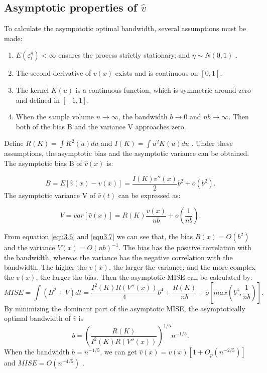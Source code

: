 \subsection{ Asymptotic properties of $\hat{v}$}
To calculate the asympototic optimal bandwidth, several assumptions must be made:
 \begin{enumerate}
  \item $E(\varepsilon_{t}^{8})<\infty$ ensures the process strictly stationary, and $\eta \sim N(0,1)$ \citep{Ling2002}.
  \item The second derivative of $v(x)$ exists and is continuous on $[0,1]$.
  \item The kernel $K(u)$ is a continuous function, which is symmetric around zero and defined in $[-1, 1]$.
  
  \item When the sample volume $n \rightarrow \infty $, the bandwidth $b \rightarrow 0 $ and $nb \rightarrow \infty $. Then both of the bias B and the variance V approaches zero.
 
\end{enumerate}
Define $R(K)= \int K^{2}(u)du$ and $I(K)=\int u^{2}K(u)du$ . Under these assumptions, the asymptotic bias and the asymptotic variance can be obtained.
The asymptotic bias B of $\hat{v}(x)$ is:

\begin{equation}
\label{equ3.6}
B=E[\hat{v}(x)-v(x)] = \frac{I(K)v''(x)}{2}b^{2}+o(b^{2}).
\end{equation}
The asymptotic variance V of $\hat{v}(t)$ can be expressed as:

\begin{equation}
\label{equ3.7}
V=var[\hat{v}(x)]=R(K)\frac{v(x)}{nb}+o(\frac{1}{nb}).
\end{equation}  

From equation \ref{equ3.6} and \ref{equ3.7} we can see that, the bias $B(x)=O(b^2)$ and the variance $V(x)=O(nb)^{-1}$. The bias has the positive correlation with the bandwidth, whereas the variance has the negative correlation with the bandwidth. The higher the $v(x)$, the larger the variance; and the more complex the $v(x)$, the larger the bias.
Then the asymptotic MISE can be calculated by:
\begin{equation}
MISE = \int(B^{2}+V)dt=\frac{I^{2}(K)R(V''(x))}{4}b^{4} + \frac{R(K)}{nb} + o[max(b^{4},\frac{1}{nb})].
\end{equation}
By minimizing the dominant part of the asymptotic MISE, the asymptotically optimal bandwidth of $\hat{v}$ is
\begin{equation}
b=(\frac{R(K)}{I^{2}(K)R(V''(x))})^{1/5}n^{-1/5}.
\end{equation}
When the bandwidth $b=n^{-1/5}$, we can get $\hat{v}(x)=v(x)[1+O_{p}(n^{-2/5})]$ and $MISE=O(n^{-4/5})$ \citep{Gasser1984,Fan1991}.

